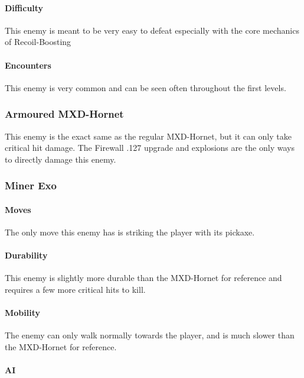 \documentclass[12pt]{article}
\begin{document}
\paragraph{Difficulty}

This enemy is meant to be very easy to defeat especially with the core mechanics of Recoil-Boosting

\paragraph{Encounters}

This enemy is very common and can be seen often throughout the first levels.

\subsubsection{Armoured MXD-Hornet}

This enemy is the exact same as the regular MXD-Hornet, but it can only take critical hit damage. The Firewall .127 upgrade and explosions are the only ways to directly damage this enemy. 

\subsubsection{Miner Exo}

\paragraph{Moves}

The only move this enemy has is striking the player with its pickaxe.

\paragraph{Durability}

This enemy is slightly more durable than the MXD-Hornet for reference and requires a few more critical hits to kill. 

\paragraph{Mobility}

The enemy can only walk normally towards the player, and is much slower than the MXD-Hornet for reference.

\paragraph{AI}
\end{document}
